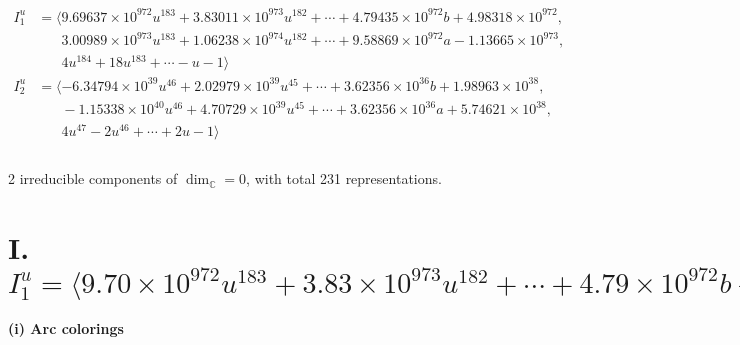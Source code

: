 \documentclass[1p]{elsarticle_modified}
\theoremstyle{definition}
\begin{document}
\begin{align*}
I^u_{1}&=\langle 
9.69637\times10^{972} u^{183}+3.83011\times10^{973} u^{182}+\cdots+4.79435\times10^{972} b+4.98318\times10^{972},\\
\phantom{I^u_{1}}&\phantom{= \langle  }3.00989\times10^{973} u^{183}+1.06238\times10^{974} u^{182}+\cdots+9.58869\times10^{972} a-1.13665\times10^{973},\\
\phantom{I^u_{1}}&\phantom{= \langle  }4 u^{184}+18 u^{183}+\cdots- u-1\rangle \\
I^u_{2}&=\langle 
-6.34794\times10^{39} u^{46}+2.02979\times10^{39} u^{45}+\cdots+3.62356\times10^{36} b+1.98963\times10^{38},\\
\phantom{I^u_{2}}&\phantom{= \langle  }-1.15338\times10^{40} u^{46}+4.70729\times10^{39} u^{45}+\cdots+3.62356\times10^{36} a+5.74621\times10^{38},\\
\phantom{I^u_{2}}&\phantom{= \langle  }4 u^{47}-2 u^{46}+\cdots+2 u-1\rangle \\
\\
\end{align*}
\raggedright * 2 irreducible components of $\dim_{\mathbb{C}}=0$, with total 231 representations.\\
\newpage
\renewcommand{\arraystretch}{1}
\centering \section*{I. $I^u_{1}= \langle 9.70\times10^{972} u^{183}+3.83\times10^{973} u^{182}+\cdots+4.79\times10^{972} b+4.98\times10^{972},\;3.01\times10^{973} u^{183}+1.06\times10^{974} u^{182}+\cdots+9.59\times10^{972} a-1.14\times10^{973},\;4 u^{184}+18 u^{183}+\cdots- u-1 \rangle$}
\flushleft \textbf{(i) Arc colorings}\\
\end{document}
